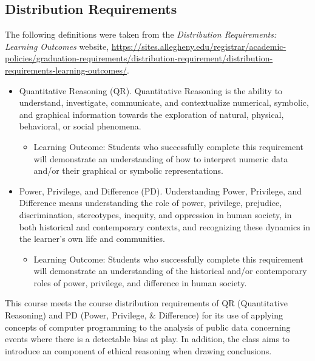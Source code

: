 \documentclass[11pt]{article} %
\begin{document}
\subsection*{Distribution Requirements}
The following definitions were taken from the \emph{Distribution Requirements: Learning Outcomes} website, \url{https://sites.allegheny.edu/registrar/academic-policies/graduation-requirements/distribution-requirement/distribution-requirements-learning-outcomes/}.

\begin{itemize}
	\item Quantitative Reasoning (QR). Quantitative Reasoning is the ability to understand, investigate, communicate, and contextualize numerical, symbolic, and graphical information towards the exploration of natural, physical, behavioral, or social phenomena.

	\begin{itemize}
		\item Learning Outcome: Students who successfully complete this requirement will demonstrate an understanding of how to interpret numeric data and/or their graphical or symbolic representations.
	\end{itemize}


	\item Power, Privilege, and Difference (PD). Understanding Power, Privilege, and Difference means understanding the role of power, privilege, prejudice, discrimination, stereotypes, inequity, and oppression in human society, in both historical and contemporary contexts, and recognizing these dynamics in the learner’s own life and communities.

	
	\begin{itemize}
		\item Learning Outcome: Students who successfully complete this requirement will demonstrate an understanding of the historical and/or contemporary roles of power, privilege, and difference in human society.
	\end{itemize}
\end{itemize}


This course meets the course distribution requirements of QR (Quantitative Reasoning) and PD (Power, Privilege, \& Difference) for its use of applying concepts of computer programming to the analysis of public data concerning events where there is a detectable bias at play. In addition, the class aims to introduce an component of ethical reasoning when drawing conclusions.
\end{document}
